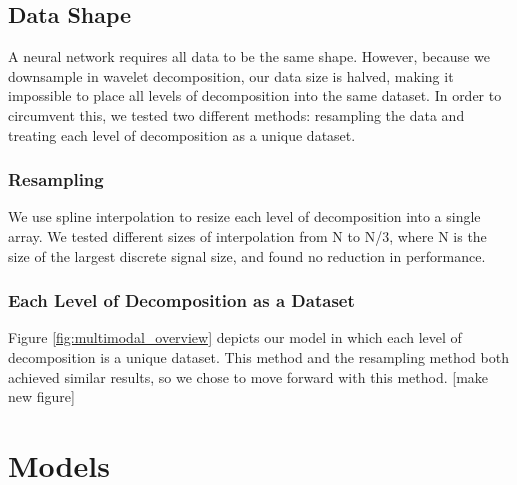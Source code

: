 \documentclass{turabian-thesis}
\begin{document}






\section{Data Shape}

A neural network requires all data to be the same shape. However, because we downsample in wavelet decomposition, our data size is halved, making it impossible to place all levels of decomposition into the same dataset. In order to circumvent this, we tested two different methods: resampling the data and treating each level of decomposition as a unique dataset.


\subsection{Resampling}

We use spline interpolation to resize each level of decomposition into a single array. We tested different sizes of interpolation from N to N/3, where N is the size of the largest discrete signal size, and found no reduction in performance.

\subsection{Each Level of Decomposition as a Dataset}
Figure \ref{fig:multimodal_overview} depicts our model in which each level of decomposition is a unique dataset. This method and the resampling method both achieved similar results, so we chose to move forward with this method.
[make new figure]

\chapter{Models}
\label{chap:models}

\end{document}
